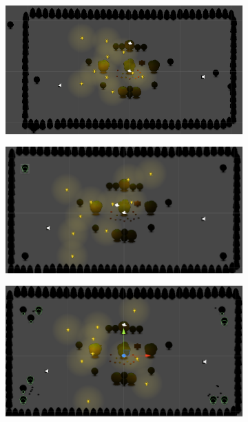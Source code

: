 \begin{figure}[h]
        \centering
        \begin{subfigure}[b]{0.482\linewidth}
                \includegraphics[width=\linewidth]{./ga_n1}
                \caption{}
                \label{fig:ga_step1}
        \end{subfigure}
        \begin{subfigure}[b]{0.49\linewidth}
                \includegraphics[width=\linewidth]{./ga_n2}
                \caption{}
                \label{fig:ga_step2}
        \end{subfigure}
        \begin{subfigure}[b]{0.5\linewidth}
                \includegraphics[width=\linewidth]{./ga_n3}

\end{subfigure}
\end{figure}
